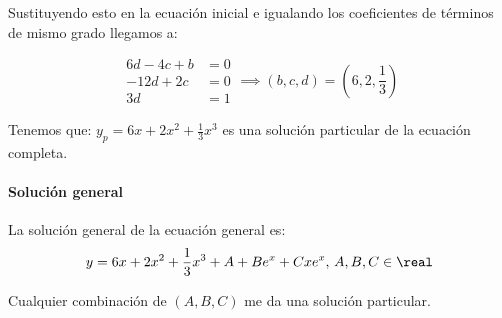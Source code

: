 \documentclass[nochap]{apuntes}
\begin{document}
\begin{problem}[9]
Sustituyendo esto en la ecuación inicial e igualando los coeficientes de términos de mismo grado llegamos a:

\[\begin{array}{cc}
6d-4c+b&=0\\
-12d + 2c &= 0\\
3d&=1\end{array} \implies (b,c,d) = \left(6,2,\frac{1}{3}\right)\]

Tenemos que: $y_p = 6x+2x^2 + \frac{1}{3} x^3$ es una solución particular de la ecuación completa.

\paragraph{Solución general}

La solución general de la ecuación general es:
\[y = 6x+2x^2+\frac{1}{3}x^3+A+Be^x + Cxe^x,\, A,B,C\in\real\]

Cualquier combinación de $(A,B,C)$ me da una solución particular.

\end{problem}
\end{document}
